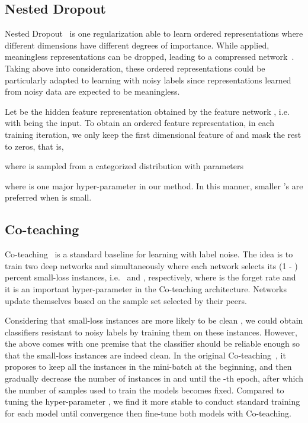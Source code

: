 \documentclass[final]{cvpr}
\begin{document}
\subsection{Nested Dropout} \label{subsec::nested}
Nested Dropout~\cite{rippel2014learning} is one regularization able to learn ordered representations where different dimensions have different degrees of importance. 
While applied, meaningless representations can be dropped, leading to a compressed network~\cite{gomez2019learning}.
Taking above into consideration, these ordered representations could be particularly adapted to learning with noisy labels since representations learned from noisy data are expected to be meaningless.


Let  be the hidden feature representation obtained by the feature network , i.e.~ with  being the input. 
To obtain an ordered feature representation, in each training iteration, we only keep the first  dimensional feature of  and mask the rest to zeros, that is,

where  is sampled from a categorized distribution with parameters

where  is one major hyper-parameter in our method.
In this manner, smaller 's are preferred when  is small. 











\subsection{Co-teaching} \label{subsec::co_teaching}
Co-teaching~\cite{han2018co} is a standard baseline for learning with label noise.
The idea is to train two deep networks  and  simultaneously where each network selects its (1 - ) percent small-loss instances, i.e.~ and , respectively, where 
 is the forget rate and it is an important hyper-parameter in the Co-teaching architecture.
Networks update themselves based on the sample set selected by their peers.


Considering that small-loss instances are more likely to be clean \cite{han2018co, jiang2018mentornet, kumar2010self, tanaka2018joint, yu2019does},
we could obtain classifiers resistant to noisy labels by training them on these instances. 
However, the above comes with one premise that the classifier should be reliable enough so that the small-loss instances are indeed clean. 
In the original {Co-teaching}~\cite{han2018co}, it proposes to keep all the instances in the mini-batch at the beginning, and then gradually decrease the number of instances in  and  until the -th epoch, after which the number of samples used to train the models becomes fixed.
Compared to tuning the hyper-parameter , we find it more stable to conduct standard training for each model until convergence then fine-tune both models with Co-teaching.
\end{document}
